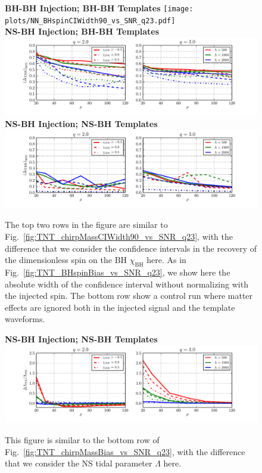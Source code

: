 \documentclass[aps,prd,amsmath,floats,floatfix, twocolumn,
superscriptaddress,nofootinbib,showpacs]{revtex4-1}
\begin{document}
\begin{figure}
\centering    
\textbf{BH-BH Injection; BH-BH Templates}
\texttt{[image: plots/NN\_BHspinCIWidth90\_vs\_SNR\_q23.pdf]}\\ 
\textbf{NS-BH Injection; BH-BH Templates}
\includegraphics[width=1.7\columnwidth]{plots/TN_BHspinCIWidth90_vs_SNR_q23.pdf}\\ 
\textbf{NS-BH Injection; NS-BH Templates}
\includegraphics[width=1.7\columnwidth]{plots/TT_BHspinCIWidth90_vs_SNR_q23.pdf}
\caption{The top two rows in the figure are similar to
Fig.~\ref{fig:TNT_chirpMassCIWidth90_vs_SNR_q23},
with the difference that we consider the confidence intervals in the recovery
of the dimensionless spin on the BH $\chi_\mathrm{BH}$ here.
As in Fig.~\ref{fig:TNT_BHspinBias_vs_SNR_q23}, we show here the absolute 
width of the confidence interval without normalizing with the injected spin.
The bottom row show a control run where matter effects are ignored both 
in the injected signal and the template waveforms.}
\label{fig:TNT_BHspinCIWidth90_vs_SNR_q23}
\end{figure}
% 
\begin{figure}
\centering
\textbf{NS-BH Injection; NS-BH Templates}
\includegraphics[width=1.7\columnwidth]{plots/TT_NSLambdaBias_vs_SNR_q23.pdf}
\caption{This figure is similar to the bottom row of
Fig.~\ref{fig:TNT_chirpMassBias_vs_SNR_q23}, with the difference that  we
consider the NS tidal parameter $\Lambda$ here.}
\label{fig:TT_NSLambdaBias_vs_SNR_q23}
\end{figure}
\end{document}

